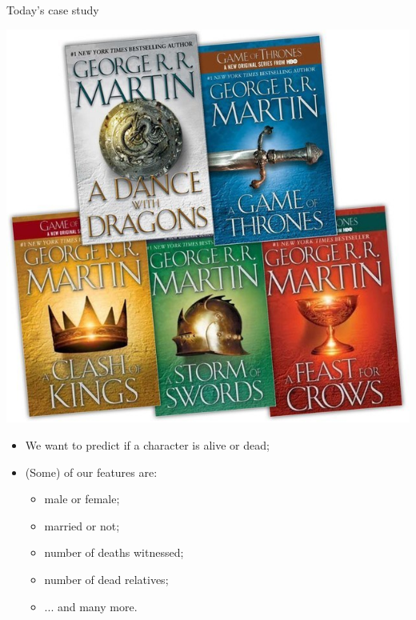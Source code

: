\bgroup
\begin{frame}{Today's case study}
\begin{minipage}{0.45\textwidth}
\includegraphics[width=\textwidth]{img/books.jpg}
\end{minipage}
\begin{minipage}{0.45\textwidth}
\begin{itemize}
\item We want to predict if a character is alive or dead;
\item (Some) of our features are:
\begin{itemize}
\item male or female; 
\item married or not;
\item number of deaths witnessed;
\item number of dead relatives;
\item ... and many more.
\end{itemize}
\end{itemize}
\end{minipage}
\end{frame}
\egroup